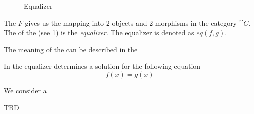 \begin{definition}[Equalizer]
\begin{figure}[H]
  \caption{Equalizer}   
  \label{fig:equlizer}
\end{figure}
The 
 $F$ gives us the mapping into 2
objects and 2 morphisms in the category $\cat{C}$. The
 of the 
 (see \cref{fig:equlizer}) is the
\textit{equalizer}. The equalizer is denoted as $eq\left(f, g\right)$.
\end{definition}

The meaning of the  can be described in the 
\begin{example}
\label{ex:equalizer_set}
In the  equalizer determines a solution for the
following equation 
\[
f(x) = g(x)
\]

We consider a

TBD
\end{example}
